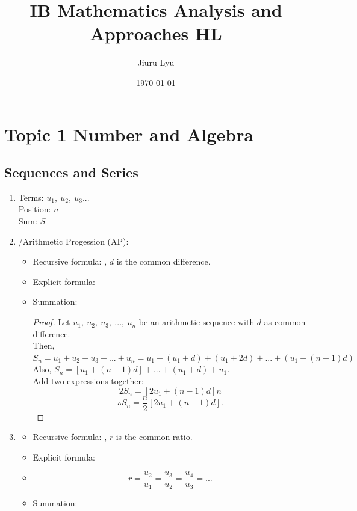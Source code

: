 \documentclass[12pt, a4paper]{article}
\title{\textbf{IB Mathematics Analysis and Approaches HL}}
\author{Jiuru Lyu}
\date{\today}
\newtheorem{proof}{Proof}[subsection]
\begin{document}
\maketitle
\tableofcontents

\newpage

\section{Topic 1 Number and Algebra}
\subsection{Sequences and Series}
\begin{enumerate}
\item Terms: $u_1,\ u_2,\ u_3...$\\Position: $n$\\Sum: $S$
\item \textbf{\color{red}{Arithmetic Sequence}}/Arithmetic Progession (AP): 
  \begin{itemize}
    \item Recursive formula: {}, $d$ is the common difference.
    \item Explicit formula: {\color{red}{$u_n=u_1+d(n-1)$}}
    \item Summation: {}
      \begin{proof}
        Let $u_1,\ u_2,\ u_3,\ ...,\ u_n$ be an arithmetic sequence with $d$ as common difference. \\
        Then, $S_n=u_1+u_2+u_3+...+u_n=u_1+(u_1+d)+(u_1+2d)+...+(u_1+(n-1)d)$\\
        Also, $S_n=[u_1+(n-1)d]+...+(u_1+d)+u_1.$\\
        Add two expressions together: 
        $$2S_n=[2u_1+(n-1)d]n$$
        $$\therefore S_n=\frac{n}{2}[2u_1+(n-1)d].$$ 
      \end{proof}
  \end{itemize}
\item {\textbf{\color{red}{Geometric Sequence}}}
  \begin{itemize}
    \item Recursive formula: {}, $r$ is the common ratio.
    \item Explicit formula: {}
    \item $$r=\frac{u_2}{u_1}=\frac{u_3}{u_2}=\frac{u_4}{u_3}=...$$
    \item Summation: {}

\end{itemize}
\end{enumerate}
\end{document}
